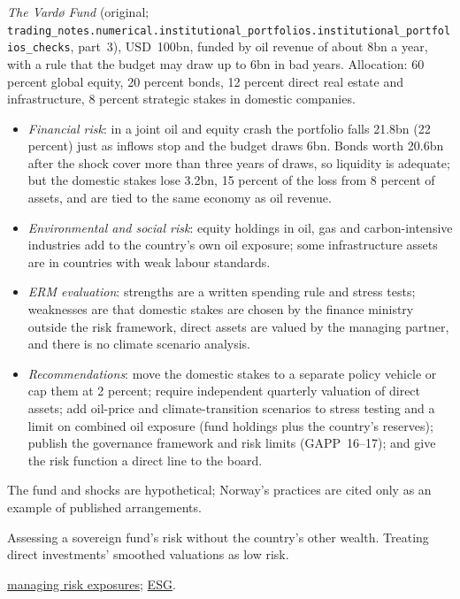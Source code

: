 \begin{qfmethod}
 \emph{The Vardø Fund} (original; \nolinkurl{trading_notes.numerical.institutional_portfolios.institutional_portfolios_checks}, part~3), USD~100bn, funded by oil revenue of about 8bn a year, with a rule that the budget may draw up to 6bn in bad years. Allocation: 60 percent global equity, 20 percent bonds, 12 percent direct real estate and infrastructure, 8 percent strategic stakes in domestic companies.
\begin{itemize}
\item \emph{Financial risk}: in a joint oil and equity crash the portfolio falls 21.8bn (22 percent) just as inflows stop and the budget draws 6bn. Bonds worth 20.6bn after the shock cover more than three years of draws, so liquidity is adequate; but the domestic stakes lose 3.2bn, 15 percent of the loss from 8 percent of assets, and are tied to the same economy as oil revenue.
\item \emph{Environmental and social risk}: equity holdings in oil, gas and carbon-intensive industries add to the country's own oil exposure; some infrastructure assets are in countries with weak labour standards.
\item \emph{ERM evaluation}: strengths are a written spending rule and stress tests; weaknesses are that domestic stakes are chosen by the finance ministry outside the risk framework, direct assets are valued by the managing partner, and there is no climate scenario analysis.
\item \emph{Recommendations}: move the domestic stakes to a separate policy vehicle or cap them at 2 percent; require independent quarterly valuation of direct assets; add oil-price and climate-transition scenarios to stress testing and a limit on combined oil exposure (fund holdings plus the country's reserves); publish the governance framework and risk limits (GAPP~16--17); and give the risk function a direct line to the board.
\end{itemize}

 The fund and shocks are hypothetical; Norway's practices are cited only as an example of published arrangements.

 Assessing a sovereign fund's risk without the country's other wealth. Treating direct investments' smoothed valuations as low risk.

 \hyperref[meth:risk-identification-modification]{managing risk exposures}; \hyperref[meth:institutional-esg-integration]{ESG}.

\end{qfmethod}

